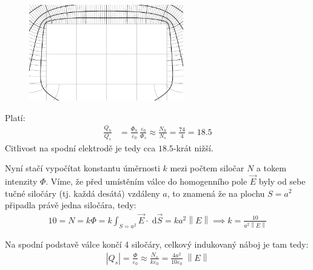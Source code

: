\documentclass[10pt,a4paper]{article}
\newcommand{\const}[1]{\text{#1}}
\newcommand{\norm}[1]{\left\lVert#1\right\rVert}
\renewcommand{\d}[1]{\;\const{d}#1}
\begin{document}
\begin{figure}[h!]
    \centering
    \includegraphics[width=0.6\textwidth]{uloha3_detail.pdf}
\end{figure}

Platí:
\begin{align*}
    \frac{Q_h}{Q_s} &= \frac{\Phi_h}{\varepsilon_0} \, \frac{\varepsilon_0}{\Phi_s} \approx \frac{N_h}{N_s} = \frac{74}{4} = 18.5
\end{align*}
Citlivost na spodní elektrodě je tedy cca $18.5$-krát nižší.

Nyní stačí vypočítat konstantu úměrnosti $k$ mezi počtem siločar $N$ a tokem intenzity $\Phi$. Víme, že před umístěním válce do homogenního pole $\vec{E}$ byly od sebe tučné siločáry (tj. každá desátá) vzdáleny $a$, to znamená že na plochu $S=a^2$ připadla právě jedna siločára, tedy:
\begin{align*}
    10 = N = k\Phi = k\int_{S=a^2} \vec{E} \cdot \d{\vec{S}} = k a^2 \norm{E} \implies k = \frac{10}{a^2 \norm{E}}
\end{align*}

Na spodní podstavě válce končí 4 siločáry, celkový indukovaný náboj je tam tedy:
\begin{align*}
    \left|Q_s\right|
    = \frac{\Phi}{\varepsilon_0}
    \approx \frac{N_s}{k\varepsilon_0}
    = \frac{4 a^2}{10 \varepsilon_0} \; \norm{E}
\end{align*}
\end{document}

